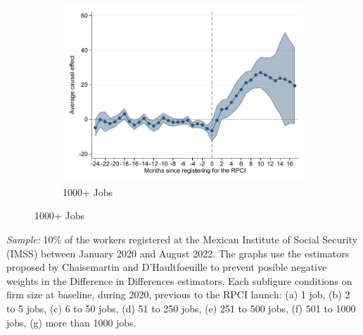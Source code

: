 \documentclass[oneside,11pt]{article}
\begin{document}
\begin{figure}[H]
\begin{center}
    \begin{subfigure}{0.49\textwidth}
    \caption{1000+ Jobs}
    \includegraphics[width=\textwidth]{04_Figures/muestra_10porciento/event_study_sal_cierre_chaisemartin_firm_size_7.pdf}
    \end{subfigure}
    
    \end{center}
\end{figure}

\scriptsize{
\noindent \textit{Sample:} 10\% of the workers registered at the Mexican Institute of Social Security (IMSS) between January 2020 and August 2022. The graphs use the estimators proposed by Chaisemartin and D'Haultfoeuille to prevent posible negative weights in the Difference in Differences estimators.  Each subfigure conditions on firm size at baseline, during 2020, previous to the RPCI launch: (a) 1 job, (b) 2 to 5 jobs, (c) 6 to 50 jobs, (d) 51 to 250 jobs, (e) 251 to 500 jobs, (f) 501 to 1000 jobs, (g) more than 1000 jobs.
}

\clearpage
\end{document}
